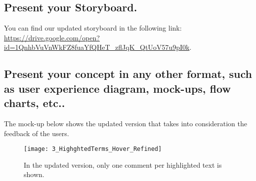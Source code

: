 \subsection{Present your Storyboard.}

You can find our updated storyboard in the following link: 
\url{https://drive.google.com/open?id=1QnhbVuVnWkFZ8fuaYfQHeT_zflJqK_QtUoV57u9pI0k}.

\subsection{Present your concept in any other format, such as user experience 
diagram, mock-ups, flow charts, etc..}

The mock-up below shows the updated version that takes into consideration the 
feedback of the users.
 
\begin{figure}[H]
\centering
\texttt{[image: 3\_HighghtedTerms\_Hover\_Refined]}
\caption{In the updated version, only one comment per highlighted text is shown.}
\end{figure}

